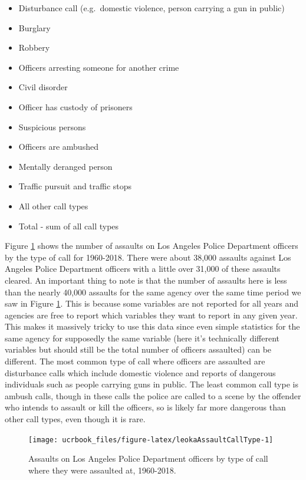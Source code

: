 \documentclass[
  12pt,
  openany]{book}
\providecommand{\tightlist}{%
  \setlength{\itemsep}{0pt}\setlength{\parskip}{0pt}}
\begin{document}
\begin{itemize}
\tightlist
\item
  Disturbance call (e.g.~domestic violence, person carrying a gun in public)
\item
  Burglary
\item
  Robbery
\item
  Officers arresting someone for another crime
\item
  Civil disorder
\item
  Officer has custody of prisoners
\item
  Suspicious persons
\item
  Officers are ambushed
\item
  Mentally deranged person
\item
  Traffic pursuit and traffic stops
\item
  All other call types
\item
  Total - sum of all call types
\end{itemize}

Figure \ref{fig:leokaAssaultCallType} shows the number of assaults on Los Angeles Police Department officers by the type of call for 1960-2018. There were about 38,000 assaults against Los Angeles Police Department officers with a little over 31,000 of these assaults cleared. An important thing to note is that the number of assaults here is less than the nearly 40,000 assaults for the same agency over the same time period we saw in Figure \ref{fig:leokaAssaultCallType}. This is because some variables are not reported for all years and agencies are free to report which variables they want to report in any given year. This makes it massively tricky to use this data since even simple statistics for the same agency for supposedly the same variable (here it's technically different variables but should still be the total number of officers assaulted) can be different. The most common type of call where officers are assaulted are disturbance calls which include domestic violence and reports of dangerous individuals such as people carrying guns in public. The least common call type is ambush calls, though in these calls the police are called to a scene by the offender who intends to assault or kill the officers, so is likely far more dangerous than other call types, even though it is rare.

\begin{figure}

{\centering \texttt{[image: ucrbook\_files/figure-latex/leokaAssaultCallType-1]} 

}

\caption{Assaults on Los Angeles Police Department officers by type of call where they were assaulted at, 1960-2018.}\label{fig:leokaAssaultCallType}
\end{figure}
\end{document}
